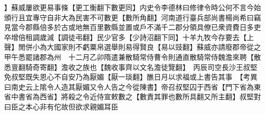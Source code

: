 】蘇威屢欲更易事條【更工衡翻下數更同】内史令李德林曰修律令時公何不言今始頒行且宜專守自非大為民害不可數更【數所角翻】河南道行臺兵部尚書楊尚希曰竊見當今郡縣倍多於古或地無百里數縣並置或戶不滿千二郡分領具僚已衆資費日多吏卒增倍租調歲減【調徒弔翻】民少官多【少詩沼翻下同】十羊九牧今存要去【上聲】閒併小為大國家則不虧粟帛選舉則易得賢良【易以豉翻】蘇威亦請廢郡帝從之甲午悉罷諸郡為州　十二月乙卯隋遣兼散騎常侍曹令則通直散騎常侍魏澹來聘【散悉亶翻騎奇寄翻】澹收之族也【魏收事齊以文名澹徒覽翻】　丙辰司空長沙王叔堅免叔堅既失恩心不自安乃為厭媚【厭一琰翻】醮日月以求福或上書告其事　【考異曰南史云上隂令人造其厭媚又令人告之今從陳書】帝召叔堅囚于西省【門下省為東省中書省為西省】將殺之令近侍宣敕數之【數責其罪也數所具翻又所主翻】叔堅對曰臣之本心非有佗故但欲求親媚耳臣